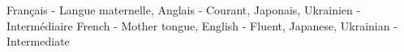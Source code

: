 
\fi


\vspace{\ItemsSpacing}

\ifnativelang
{}
{Fran\c cais - \textmd{Langue maternelle,} Anglais - \textmd{Courant,} Japonais, Ukrainien - \textmd{Interm\'ediaire}}{}{}{}{}
\else
{}
{French - \textmd{Mother tongue,} English - \textmd{Fluent,} Japanese, Ukrainian - \textmd{Intermediate}}{}{}{}{}
\fi










